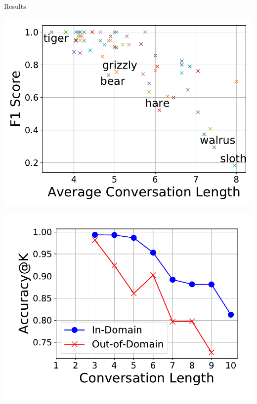 \documentclass[final]{beamer}
\newlength{\twocolwid}
\begin{document}
\begin{frame}[t]
\begin{columns}[t]
\begin{column}{\twocolwid}
\begin{block}{Results}
\begin{minipage}{.3\textwidth}
  \centering
  \includegraphics[width=\textwidth]{figures/corr_conv_len_difficulty}
\end{minipage} \quad
\begin{minipage}{.3\textwidth}
  \centering
  \includegraphics[width=\textwidth]{figures/acc_top-6_adaptive_conv-len_in_out-line}
\end{minipage}
\begin{minipage}{.3\textwidth}
  \centering

\end{minipage}
\end{block}
\end{column}
\end{columns}
\end{frame}
\end{document}

